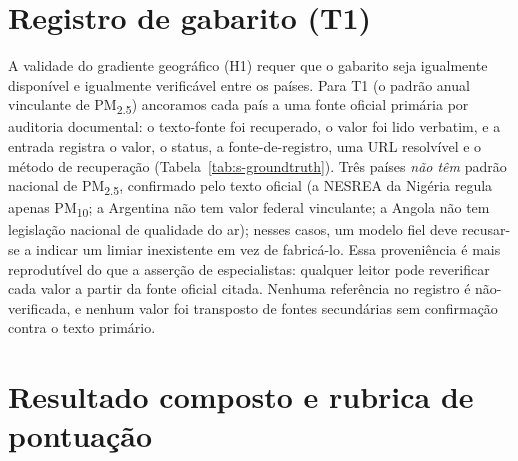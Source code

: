 \documentclass[11pt,a4paper]{article}
\begin{document}


\section{Registro de gabarito (T1)}

A validade do gradiente geográfico (H1) requer que o gabarito seja igualmente
disponível e igualmente verificável entre os países. Para T1 (o padrão anual
vinculante de PM\textsubscript{2.5}) ancoramos cada país a uma fonte oficial
primária por auditoria documental: o texto-fonte foi recuperado, o valor foi lido
verbatim, e a entrada registra o valor, o status, a fonte-de-registro, uma URL
resolvível e o método de recuperação (Tabela~\ref{tab:s-groundtruth}). Três países
\emph{não têm} padrão nacional de PM\textsubscript{2.5}, confirmado pelo texto
oficial (a NESREA da Nigéria regula apenas PM\textsubscript{10}; a Argentina não
tem valor federal vinculante; a Angola não tem legislação nacional de qualidade do
ar); nesses casos, um modelo fiel deve recusar-se a indicar um limiar inexistente
em vez de fabricá-lo. Essa proveniência é mais reprodutível do que a asserção de
especialistas: qualquer leitor pode reverificar cada valor a partir da fonte
oficial citada. Nenhuma referência no registro é não-verificada, e nenhum valor foi
transposto de fontes secundárias sem confirmação contra o texto primário.



\section{Resultado composto e rubrica de pontuação}
\end{document}
